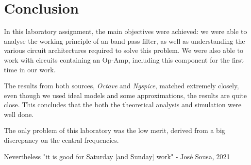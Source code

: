 \section{Conclusion}
\label{sec:conclusion}

\indent

In this laboratory assignment, the main objectives were achieved: we were able to analyse the working principle of an band-pass filter, as well as understanding the various circuit architectures required to solve this problem. We were also able to work with circuits containing an Op-Amp, including this component for the first time in our work. 

The results from both sources, \textit{Octave} and \textit{Ngspice}, matched extremely closely, even though we used ideal models and some approximations, the results are quite close. This concludes that the both the theoretical analysis and simulation were well done.

The only problem of this laboratory was the low merit, derived from a big discrepancy on the central frequencies.

Nevertheless "it is good for Saturday [and Sunday] work" - José Sousa, 2021

